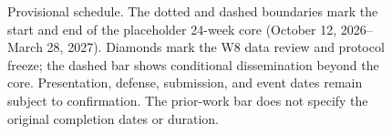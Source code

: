 \begin{figure}[H]
{%
}
\caption{Provisional schedule. The dotted and dashed boundaries mark the
start and end of the placeholder 24-week core (October 12, 2026--March 28,
2027). Diamonds mark the W8 data review and protocol freeze; the dashed bar
shows conditional dissemination beyond the core. Presentation, defense,
submission, and event dates remain subject to confirmation. The prior-work
bar does not specify the original completion dates or duration.}
\label{fig:timeline}
\end{figure}
